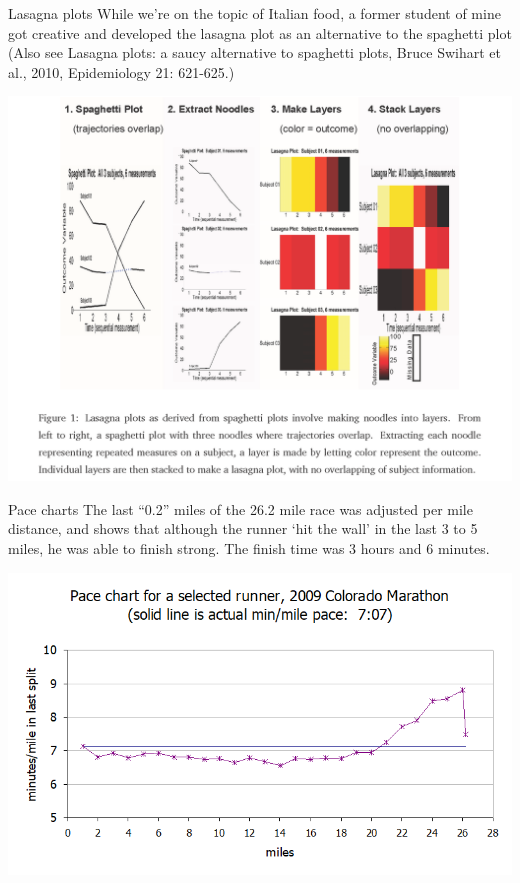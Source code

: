 \documentclass[
  9pt,
  ignorenonframetext,
]{beamer}
\begin{document}
\begin{frame}{Lasagna plots}
\protect\hypertarget{lasagna-plots}{}
While we're on the topic of Italian food, a former student of mine got
creative and developed the lasagna plot as an alternative to the
spaghetti plot (Also see Lasagna plots: a saucy alternative to spaghetti
plots, Bruce Swihart et al., 2010, Epidemiology 21: 621-625.)

\tiny

\begin{center}\includegraphics[width=0.6\linewidth]{figs_L2/L2-f10} \end{center}

\tiny
\end{frame}

\begin{frame}{Pace charts}
\protect\hypertarget{pace-charts}{}
The last ``0.2'' miles of the 26.2 mile race was adjusted per mile
distance, and shows that although the runner `hit the wall' in the last
3 to 5 miles, he was able to finish strong. The finish time was 3 hours
and 6 minutes.

\tiny

\begin{center}\includegraphics[width=0.6\linewidth]{figs_L2/L2-f11} \end{center}

\tiny
\end{frame}
\end{document}
